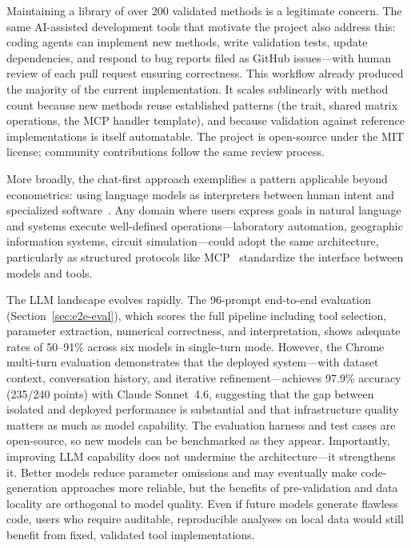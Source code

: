 Maintaining a library of over 200 validated methods is a legitimate
concern. The same AI-assisted development tools that motivate the
project also address this: coding agents can implement new methods, write validation
tests, update dependencies, and respond to bug reports filed as
GitHub issues---with human review of each pull request ensuring
correctness. This workflow already produced the majority of the
current implementation. It scales sublinearly with method count
because new methods reuse established patterns (the
 trait, shared matrix operations, the MCP
handler template), and because validation against 
reference implementations is itself automatable. The project is
open-source under the MIT license; community contributions follow
the same review process.

More broadly, the chat-first approach exemplifies a pattern applicable
beyond econometrics: using language models as interpreters between human
intent and specialized software~\citep{Yao+etal:2023,Schick+etal:2023}.
Any domain where users express goals in natural language and systems
execute well-defined operations---laboratory automation, geographic
information systems, circuit simulation---could adopt the same
architecture, particularly as structured protocols like
MCP~\citep{MCP:2024} standardize the interface between models and tools.

The LLM landscape evolves rapidly.  The 96-prompt end-to-end evaluation
(Section~\ref{sec:e2e-eval}), which scores the full pipeline including
tool selection, parameter extraction, numerical correctness, and
interpretation, shows adequate rates of 50--91\% across six models in
single-turn mode.
However, the Chrome multi-turn evaluation demonstrates that the
deployed system---with dataset context, conversation history, and
iterative refinement---achieves 97.9\% accuracy (235/240 points) with
Claude Sonnet~4.6, suggesting that the gap between isolated and
deployed performance is substantial and that infrastructure quality
matters as much as model capability.  The evaluation harness and test
cases are open-source, so new models can be benchmarked as they appear.
Importantly, improving LLM capability does not undermine the
architecture---it strengthens it.  Better models reduce parameter
omissions and may eventually make code-generation approaches more
reliable, but the benefits of pre-validation and data locality are
orthogonal to model quality.  Even if future models generate flawless
code, users who require auditable, reproducible analyses on local data
would still benefit from fixed, validated tool implementations.

